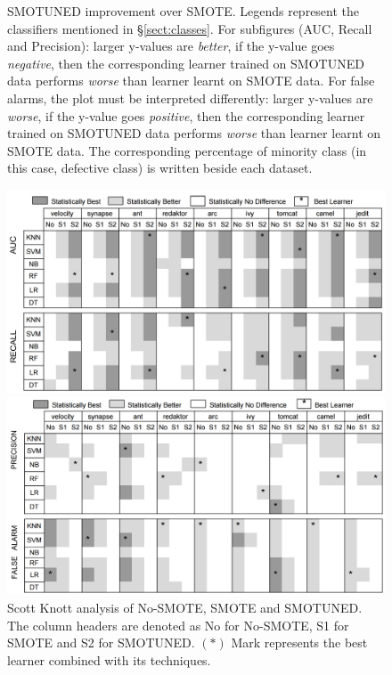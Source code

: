 \documentclass[10pt,conference]{IEEEtran}
\theoremstyle{break}
\theoremstyle{break}
\newcommand{\tion}[1]{{\S}\ref{sect:#1}}
\begin{document}
\begin{figure}[!t]
    \caption{SMOTUNED improvement over SMOTE. Legends represent the classifiers mentioned in \tion{classes}. For subfigures (AUC, Recall and Precision): larger y-values are {\em better}, if the y-value goes {\em negative}, then the corresponding learner trained on SMOTUNED data performs {\em worse} than learner learnt on SMOTE data. For false alarms, the plot must be interpreted differently: larger y-values are {\em worse}, if the y-value goes {\em positive}, then the corresponding learner trained on SMOTUNED data performs {\em worse} than learner learnt on SMOTE data. The corresponding percentage of minority class (in this case, defective class) is written beside each dataset.}
    \label{fig:tuned}
\end{figure}
\begin{figure}[!t]
\begin{minipage}{.5\linewidth}
\centering
        \includegraphics[width=.9\linewidth]{./fig/AUC_recall.png}
            \end{minipage}%
\begin{minipage}{.5\linewidth}
        \centering
        \includegraphics[width=.9\linewidth]{./fig/prec_pf.png}
    \end{minipage}%
    \caption{Scott Knott analysis of No-SMOTE, SMOTE and SMOTUNED. The column headers are denoted as No for No-SMOTE, S1 for SMOTE and S2 for SMOTUNED. $(\ast)$ Mark represents the best learner combined with its techniques.}
    \label{fig:stats}
\vspace{-0.2cm}
\end{figure}
\end{document}
